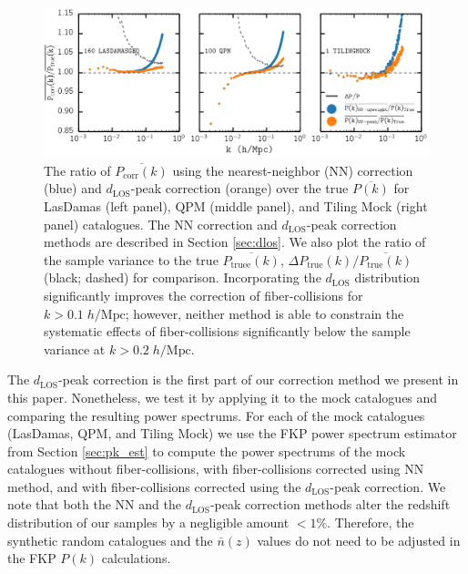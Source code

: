\documentclass{emulateapj}
\begin{document}
\begin{figure}
\begin{center}
\includegraphics[scale=0.55]{fcpaper_pk_peakonly_comp.png} 
\caption{The ratio of $\overline{P_\mathrm{corr} (k)}$ using the nearest-neighbor (NN) correction (blue) and $d_\mathrm{LOS}$-peak correction (orange) over the true $\overline{P(k)}$ for LasDamas (left panel), QPM (middle panel), and Tiling Mock (right panel) catalogues. The NN correction and $d_\mathrm{LOS}$-peak correction methods are described in Section \ref{sec:dlos}. We also plot the ratio of the sample variance to the true $\overline{P_\mathrm{truee}(k)}$, $\Delta P_\mathrm{true}(k) / \overline{P_\mathrm{true}(k)}$ (black; dashed) for comparison. Incorporating the $d_{\mathrm{LOS}}$ distribution significantly improves the correction of fiber-collisions for $k > 0.1 \; h/\mathrm{Mpc}$; however, neither method is able to constrain the systematic effects of fiber-collisions significantly below the sample variance at $k > 0.2 \; h/\mathrm{Mpc}$.}\label{fig:peakonly}
\end{center}
\end{figure}

The $d_\mathrm{LOS}$-peak correction is the first part of our correction method we present in this paper. Nonetheless, we test it by applying it to the mock catalogues and comparing the resulting power spectrums. For each of the mock catalogues (LasDamas, QPM, and Tiling Mock) we use the FKP power spectrum estimator from Section \ref{sec:pk_est} to compute the power spectrums of the mock catalogues without fiber-collisions, with fiber-collisions corrected using NN method, and with fiber-collisions corrected using the $d_\mathrm{LOS}$-peak correction. We note that both the NN and the $d_\mathrm{LOS}$-peak correction methods alter the redshift distribution of our samples by a negligible amount $< 1\%$. Therefore, the synthetic random catalogues and the $\bar{n}(z)$ values do not need to be adjusted in the FKP $P(k)$ calculations.
\end{document}
